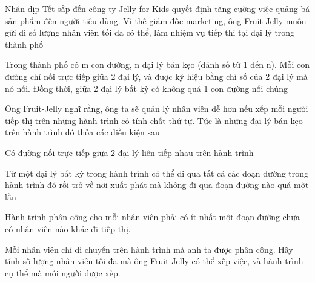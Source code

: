 Nhân dịp Tết sắp đến công ty Jelly-for-Kids quyết định tăng cường việc quảng bá sản phẩm đến người tiêu dùng. Vì thế giám đốc marketing, ông Fruit-Jelly muốn gửi đi số lượng nhân viên tối đa có thể, làm nhiệm vụ tiếp thị tại đại lý trong thành phố

Trong thành phố có m con đường, n đại lý bán kẹo (đánh số từ 1 đến n). Mỗi con đường chỉ nối trực tiếp giữa 2 đại lý, và được ký hiệu bằng chỉ số của 2 đại lý mà nó nối. Đồng thời, giữa 2 đại lý bất kỳ có không quá 1 con đường nối chúng

Ông Fruit-Jelly nghĩ rằng, ông ta sẽ quản lý nhân viên dễ hơn nếu xếp mỗi người tiếp thị trên những hành trình có tính chất thứ tự. Tức là những đại lý bán kẹo trên hành trình đó thỏa các điều kiện sau

Có đường nối trực tiếp giữa 2 đại lý liên tiếp nhau trên hành trình

Từ một đại lý bất kỳ trong hành trình có thể đi qua tất cả các đoạn đường trong hành trình đó rồi trở về nơi xuất phát mà không đi qua đoạn đường nào quá một lần

Hành trình phân công cho mỗi nhân viên phải có ít nhất một đoạn đường chưa có nhân viên nào khác đi tiếp thị.

Mỗi nhân viên chỉ di chuyển trên hành trình mà anh ta được phân công. Hãy tính số lượng nhân viên tối đa mà ông Fruit-Jelly có thể xếp việc, và hành trình cụ thể mà mỗi người được xếp.